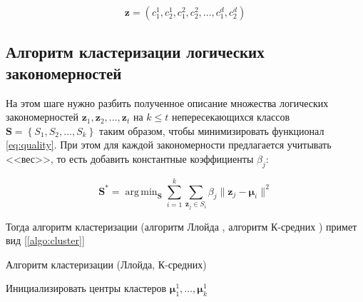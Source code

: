 \documentclass[12pt]{article}
\DeclareMathOperator*{\argmin}{arg\,min}
\begin{document}
\[\bm{z} = (c_1^1, c_2^1, c_1^2, c_2^2, \dots, c_1^d, c_2^d)\]

\subsection{Алгоритм кластеризации логических закономерностей}
На этом шаге нужно разбить полученное описание множества логических
закономерностей \(\bm{z}_1, \bm{z}_2, \dots, \bm{z}_t\) на \(k \leq
t\) непересекающихся классов \(\bm{S} = \left\{S_1, S_2, \dots,
S_k\right\}\) таким образом, чтобы минимизировать функционал
\ref{eq:quality}. При этом для каждой закономерности предлагается
учитывать <<вес>>, то есть добавить константные коэффициенты
\(\beta_j\):

\begin{equation}\label{eq:quality}
\bm{S}^* =
\argmin_{\bm{S}}
\sum_{i=1}^k \sum_{\bm{z}_j\in S_i} \beta_j \|\bm{z}_j - \bm{\mu}_i\|^2
\end{equation}

Тогда алгоритм кластеризации
(алгоритм Ллойда \cite{lloyd06}, алгоритм К-средних \cite{macqueen67})
примет вид [\ref{algo:cluster}]

\begin{algorithm}[!htpb]
  \caption{Алгоритм кластеризации (Ллойда, К-средних)}
  \label{algo:cluster}
   {
    Инициализировать центры кластеров
    \(\bm{\mu}_1^1, \dots, \bm{\mu}_k^1\)\;
    \;
  }
\end{algorithm}
\end{document}
